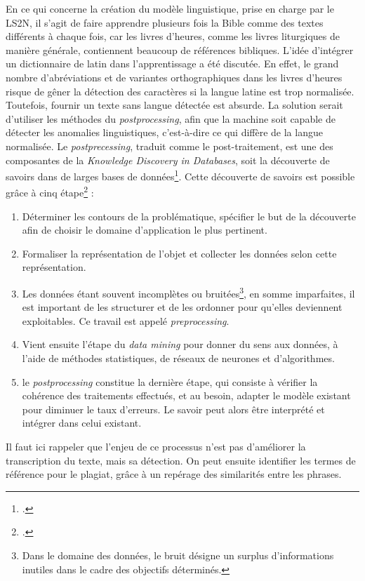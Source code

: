 \documentclass[a4paper,12pt,twoside]{book}
\begin{document}
En ce qui concerne la création du modèle linguistique, prise en charge par le LS2N, il s'agit de faire apprendre plusieurs fois la Bible comme des textes différents à chaque fois, car les livres d'heures, comme les livres liturgiques de manière générale, contiennent beaucoup de références bibliques. L'idée d'intégrer un dictionnaire de latin dans l'apprentissage a été discutée. En effet, le grand nombre d'abréviations et de variantes orthographiques dans les livres d'heures risque de gêner la détection des caractères si la langue latine est trop normalisée. Toutefois, fournir un texte sans langue détectée est absurde. La solution serait d'utiliser les méthodes du \textit{postprocessing}, afin que la machine soit capable de détecter les anomalies linguistiques, c'est-à-dire ce qui diffère de la langue normalisée. Le \textit{postprecessing}, traduit comme le \og post-traitement\fg{}, est une des composantes de la \textit{Knowledge Discovery in Databases}, soit la découverte de savoirs dans de larges bases de données\footcite[p. 1]{Postprocessing}. Cette découverte de savoirs est possible grâce à cinq étape\footcite[p. 2]{Postprocessing} : 
\begin{enumerate}
    \item Déterminer les contours de la problématique, spécifier le but de la découverte afin de choisir le domaine d'application le plus pertinent.
    \item Formaliser la représentation de l'objet et collecter les données selon cette représentation.
    \item Les données étant souvent incomplètes ou \og bruitées\fg{}\footnote{Dans le domaine des données, le bruit désigne un surplus d'informations inutiles dans le cadre des objectifs déterminés.}, en somme imparfaites, il est important de les structurer et de les ordonner pour qu'elles deviennent exploitables. Ce travail est appelé \og \textit{preprocessing}\fg{}.
    \item Vient ensuite l'étape du \textit{data mining} pour donner du sens aux données, à l'aide de méthodes statistiques, de réseaux de neurones et d'algorithmes.
    \item le \textit{postprocessing} constitue la dernière étape, qui consiste à vérifier la cohérence des traitements effectués, et au besoin, adapter le modèle existant pour diminuer le taux d'erreurs. Le savoir peut alors être interprété et intégrer dans celui existant. 
\end{enumerate}

Il faut ici rappeler que l'enjeu de ce processus n'est pas d'améliorer la transcription du texte, mais sa détection. On peut ensuite identifier les termes de référence pour le plagiat, grâce à un repérage des similarités entre les phrases. \\
\end{document}
